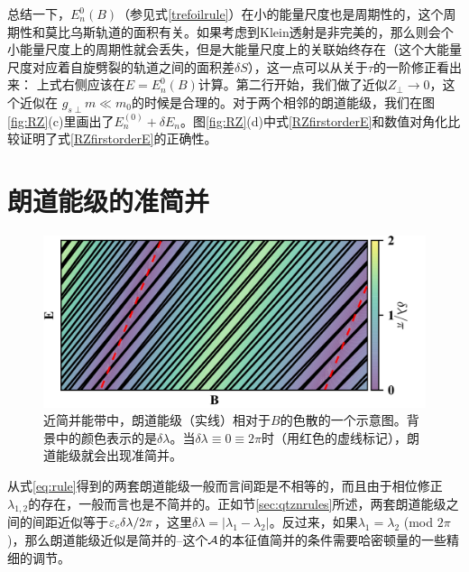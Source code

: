 总结一下，$E_n^0(B)$（参见式\ref{trefoilrule}）在小的能量尺度也是周期性的，这个周期性和莫比乌斯轨道的面积有关。如果考虑到Klein透射是非完美的，那么则会个小能量尺度上的周期性就会丢失，但是大能量尺度上的关联始终存在（这个大能量尺度对应着自旋劈裂的轨道之间的面积差$\delta S$），这一点可以从关于$\tau$的一阶修正看出来：
上式右侧应该在$E{=}E_n^0(B)$计算。第二行开始，我们做了近似$Z_{\perp}{\rightarrow}0$，这个近似在 $g_{s\perp}m{\ll}m_0$的时候是合理的。对于两个相邻的朗道能级，我们在图\ref{fig:RZ}(c)里画出了$E_n^{(0)}+\delta E_n$。图\ref{fig:RZ}(d)中式\ref{RZfirstorderE}和数值对角化比较证明了式\ref{RZfirstorderE}的正确性。

\section{朗道能级的准简并}\label{sec:llquasideg}

\begin{figure}
	\includegraphics[width=1.0\textwidth]{../figures/LL.png}
	\centering
	\caption{近简并能带中，朗道能级（实线）相对于$B$的色散的一个示意图。背景中的颜色表示的是$\delta\lambda$。当$\delta\lambda\equiv 0\equiv 2\pi$时（用红色的虚线标记），朗道能级就会出现准简并。\label{fig:LL}}
\end{figure}

从式\ref{eq:rule}得到的两套朗道能级一般而言间距是不相等的，而且由于相位修正$\lambda_{1,2}$的存在，一般而言也是不简并的。正如节\ref{sec:qtznrules}所述，两套朗道能级之间的间距近似等于$\varepsilon_c\delta \lambda/2\pi$，这里$\delta \lambda=|\lambda_1-\lambda_2|$。反过来，如果$\lambda_1{=}\lambda_2$ (mod $2\pi$)，那么朗道能级近似是简并的--这个${\cal A}$的本征值简并的条件需要哈密顿量的一些精细的调节。

